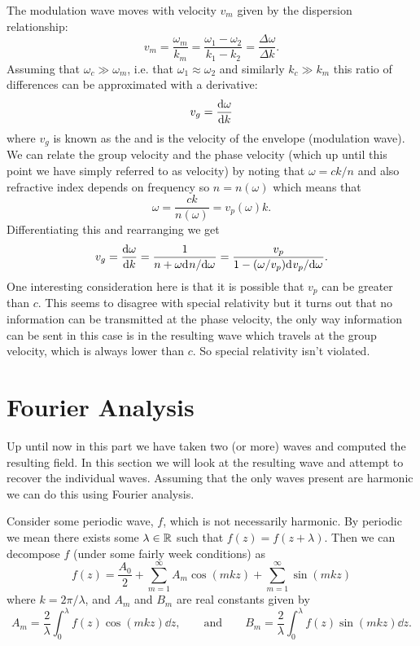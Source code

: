     The modulation wave moves with velocity \(v_m\) given by the dispersion relationship:
    \[v_m = \frac{\omega_m}{k_m} = \frac{\omega_1 - \omega_2}{k_1 - k_2} = \frac{\Delta \omega}{\Delta k}.\]
    Assuming that \(\omega_c \gg \omega_m\), i.e. that \(\omega_1 \approx \omega_2\) and similarly \(k_c \gg k_m\) this ratio of differences can be approximated with a derivative:
    \[v_g = \dv{\omega}{k}\]
    where \(v_g\) is known as the  and is the velocity of the envelope (modulation wave).
    We can relate the group velocity and the phase velocity (which up until this point we have simply referred to as velocity) by noting that \(\omega = ck/n\) and also refractive index depends on frequency so \(n = n(\omega)\) which means that
    \[\omega = \frac{ck}{n(\omega)} = v_p(\omega)k.\]
    Differentiating this and rearranging we get
    \[v_g = \dv{\omega}{k} = \frac{1}{n + \omega \mathrm{d}^{}{n}/\mathrm{d}{\omega}^{}} = \frac{v_p}{1 - (\omega/v_p)\mathrm{d}^{}{v_p}/\mathrm{d}{\omega}^{}}.\]
    One interesting consideration here is that it is possible that \(v_p\) can be greater than \(c\).
    This seems to disagree with special relativity but it turns out that no information can be transmitted at the phase velocity, the only way information can be sent in this case is in the resulting wave which travels at the group velocity, which is always lower than \(c\).
    So special relativity isn't violated.
    
    \section{Fourier Analysis}
    Up until now in this part we have taken two (or more) waves and computed the resulting field.
    In this section we will look at the resulting wave and attempt to recover the individual waves.
    Assuming that the only waves present are harmonic we can do this using Fourier analysis.
    
    
    Consider some periodic wave, \(f\), which is not necessarily harmonic.
    By periodic we mean there exists some \(\lambda\in\mathbb{R}\) such that \(f(z) = f(z + \lambda)\).
    Then we can decompose \(f\) (under some fairly week conditions) as
    \[f(z) = \frac{A_0}{2} + \sum_{m=1}^{\infty} A_m\cos(mkz) + \sum_{m=1}^{\infty} \sin(mkz)\]
    where \(k = 2\pi/\lambda\), and \(A_m\) and \(B_m\) are real constants given by
    \[A_m = \frac{2}{\lambda} \int_{0}^{\lambda} f(z) \cos(mkz)\dd{z}, \qquad\text{and}\qquad B_m = \frac{2}{\lambda}\int_{0}^{\lambda} f(z)\sin(mkz)\dd{z}.\]
    
